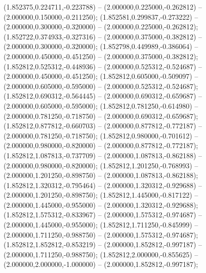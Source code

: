  (1.852375,0.224711,-0.223788) -- (2.000000,0.225000,-0.262812) -- (2.000000,0.150000,-0.211250);
 (1.852581,0.299837,-0.273222) -- (2.000000,0.300000,-0.320000) -- (2.000000,0.225000,-0.262812);
 (1.852722,0.374933,-0.327316) -- (2.000000,0.375000,-0.382812) -- (2.000000,0.300000,-0.320000);
 (1.852798,0.449989,-0.386064) -- (2.000000,0.450000,-0.451250) -- (2.000000,0.375000,-0.382812);
 (1.852812,0.525312,-0.448936) -- (2.000000,0.525312,-0.524687) -- (2.000000,0.450000,-0.451250);
 (1.852812,0.605000,-0.509097) -- (2.000000,0.605000,-0.595000) -- (2.000000,0.525312,-0.524687);
 (1.852812,0.690312,-0.564445) -- (2.000000,0.690312,-0.659687) -- (2.000000,0.605000,-0.595000);
 (1.852812,0.781250,-0.614980) -- (2.000000,0.781250,-0.718750) -- (2.000000,0.690312,-0.659687);
 (1.852812,0.877812,-0.660703) -- (2.000000,0.877812,-0.772187) -- (2.000000,0.781250,-0.718750);
 (1.852812,0.980000,-0.701612) -- (2.000000,0.980000,-0.820000) -- (2.000000,0.877812,-0.772187);
 (1.852812,1.087813,-0.737709) -- (2.000000,1.087813,-0.862188) -- (2.000000,0.980000,-0.820000);
 (1.852812,1.201250,-0.768993) -- (2.000000,1.201250,-0.898750) -- (2.000000,1.087813,-0.862188);
 (1.852812,1.320312,-0.795464) -- (2.000000,1.320312,-0.929688) -- (2.000000,1.201250,-0.898750);
 (1.852812,1.445000,-0.817122) -- (2.000000,1.445000,-0.955000) -- (2.000000,1.320312,-0.929688);
 (1.852812,1.575312,-0.833967) -- (2.000000,1.575312,-0.974687) -- (2.000000,1.445000,-0.955000);
 (1.852812,1.711250,-0.845999) -- (2.000000,1.711250,-0.988750) -- (2.000000,1.575312,-0.974687);
 (1.852812,1.852812,-0.853219) -- (2.000000,1.852812,-0.997187) -- (2.000000,1.711250,-0.988750);
 (1.852812,2.000000,-0.855625) -- (2.000000,2.000000,-1.000000) -- (2.000000,1.852812,-0.997187);
